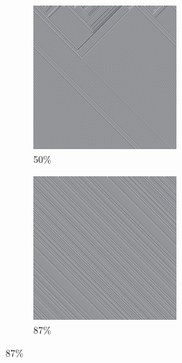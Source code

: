\documentclass[12pt, fleqn]{report}                             %
\theoremstyle{break}                                            %
\begin{document}
\begin{figure}[ht!]
\begin{subfigure}[b]{0.4\linewidth}
          \includegraphics[width=0.6\textwidth]{Images/43/c.png}
          \caption{50\%}
        \end{subfigure}
        \begin{subfigure}[b]{0.4\linewidth}
          \includegraphics[width=0.6\textwidth]{Images/43/d.png}
          \caption{87\%}
        \end{subfigure}
      \end{figure}
\end{document}

